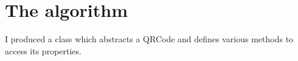 \chapter{The algorithm}

I produced a class which abstracts a QRCode and defines various methods to access its properties.